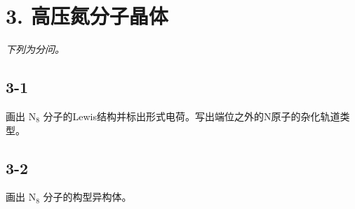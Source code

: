 \section*{3. 高压氮分子晶体}
\textit{下列为分问。}

\subsection*{3-1}
画出 $\mathrm { N } _ { 8 }$ 分⼦的Lewis结构并标出形式电荷。写出端位之外的N原⼦的杂化轨道类型。

\subsection*{3-2}
画出 $\mathrm { N } _ { 8 }$ 分⼦的构型异构体。

